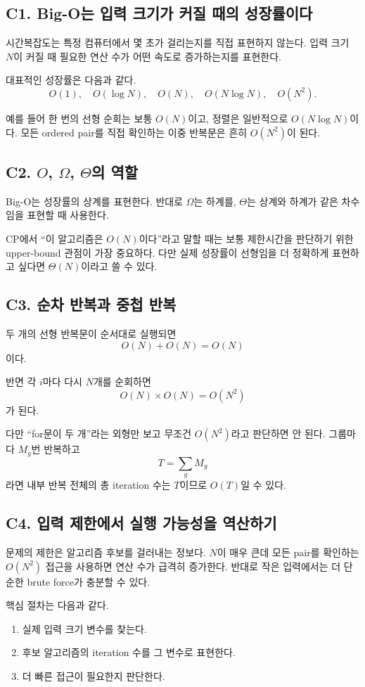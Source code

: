 \subsection{C1. Big-O는 입력 크기가 커질 때의 성장률이다}
시간복잡도는 특정 컴퓨터에서 몇 초가 걸리는지를 직접 표현하지 않는다. 입력 크기 $N$이 커질 때 필요한 연산 수가 어떤 속도로 증가하는지를 표현한다.

대표적인 성장률은 다음과 같다.
\[
O(1),\quad O(\log N),\quad O(N),\quad O(N\log N),\quad O(N^2).
\]

예를 들어 한 번의 선형 순회는 보통 $O(N)$이고, 정렬은 일반적으로 $O(N\log N)$이다. 모든 ordered pair를 직접 확인하는 이중 반복문은 흔히 $O(N^2)$이 된다.

\subsection{C2. $O$, $\Omega$, $\Theta$의 역할}
Big-O는 성장률의 상계를 표현한다. 반대로 $\Omega$는 하계를, $\Theta$는 상계와 하계가 같은 차수임을 표현할 때 사용한다.

CP에서 ``이 알고리즘은 $O(N)$이다''라고 말할 때는 보통 제한시간을 판단하기 위한 upper-bound 관점이 가장 중요하다. 다만 실제 성장률이 선형임을 더 정확하게 표현하고 싶다면 $\Theta(N)$이라고 쓸 수 있다.

\subsection{C3. 순차 반복과 중첩 반복}
두 개의 선형 반복문이 순서대로 실행되면
\[
O(N)+O(N)=O(N)
\]
이다.

반면 각 $i$마다 다시 $N$개를 순회하면
\[
O(N)\times O(N)=O(N^2)
\]
가 된다.

다만 ``for문이 두 개''라는 외형만 보고 무조건 $O(N^2)$라고 판단하면 안 된다. 그룹마다 $M_g$번 반복하고
\[
T=\sum_g M_g
\]
라면 내부 반복 전체의 총 iteration 수는 $T$이므로 $O(T)$일 수 있다.

\subsection{C4. 입력 제한에서 실행 가능성을 역산하기}
문제의 제한은 알고리즘 후보를 걸러내는 정보다. $N$이 매우 큰데 모든 pair를 확인하는 $O(N^2)$ 접근을 사용하면 연산 수가 급격히 증가한다. 반대로 작은 입력에서는 더 단순한 brute force가 충분할 수 있다.

핵심 절차는 다음과 같다.
\begin{enumerate}
  \item 실제 입력 크기 변수를 찾는다.
  \item 후보 알고리즘의 iteration 수를 그 변수로 표현한다.
  \item 더 빠른 접근이 필요한지 판단한다.
\end{enumerate}


